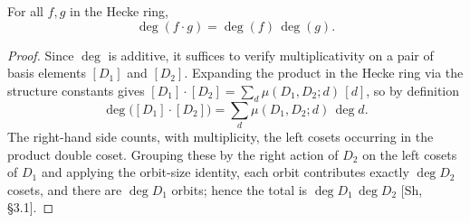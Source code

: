 \begin{lemma}\label{lem:deg-mul}
\leanok
{}
For all $f,g$ in the Hecke ring,
\[
  \deg(f\cdot g)=\deg(f)\,\deg(g).
\]
\end{lemma}

\begin{proof}\leanok
{}
Since $\deg$ is additive, it suffices to verify multiplicativity on a pair of basis
elements $[D_1]$ and $[D_2]$. Expanding the product in the Hecke ring via the structure
constants gives $[D_1]\cdot[D_2]=\sum_d \mu(D_1,D_2;d)\,[d]$, so by definition
\[
  \deg\bigl([D_1]\cdot[D_2]\bigr)=\sum_d \mu(D_1,D_2;d)\,\deg d.
\]
The right-hand side counts, with multiplicity, the left cosets occurring in the product
double coset. Grouping these by the right action of $D_2$ on the left cosets of $D_1$ and
applying the orbit-size identity, each orbit contributes exactly $\deg D_2$ cosets, and
there are $\deg D_1$ orbits; hence the total is $\deg D_1\,\deg D_2$ [Sh, \S3.1].
\end{proof}

